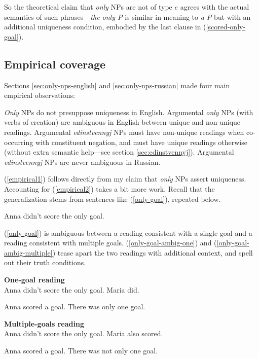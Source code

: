 So the theoretical claim that \textit{only} NPs are not of type $e$ agrees with the actual semantics of such phrases---\textit{the only P} is similar in meaning to \textit{a P} but with an additional uniqueness condition, embodied by the last clause in (\ref{scored-only-goal}).

\subsection{Empirical coverage}
Sections \ref{sec:only-nps-english} and \ref{sec:only-nps-russian} made four main empirical observations:

\begin{exe}
	\ex \label{empirical1} \textit{Only} NPs do not presuppose uniqueness in English.
	\ex \label{empirical2} Argumental \textit{only} NPs (with verbs of creation) are ambiguous in English between unique and non-unique readings.
	\ex \label{empirical3} Argumental \textit{edinstvennyj} NPs must have non-unique readings when co-occurring with constituent negation, and must have unique readings otherwise (without extra semantic help---see section \ref{sec:edinstvennyj}).
	\ex \label{empirical4} Argumental \textit{edinstvennyj} NPs are never ambiguous in Russian.
\end{exe}

(\ref{empirical1}) follows directly from my claim that \textit{only} NPs assert uniqueness. Accounting for (\ref{empirical2}) takes a bit more work. Recall that the generalization stems from sentences like (\ref{only-goal}), repeated below.

\begin{exe}
	 Anna didn't score the only goal.
\end{exe}

(\ref{only-goal}) is ambiguous between a reading consistent with a single goal and a reading consistent with multiple goals. (\ref{only-goal-ambig-one}) and (\ref{only-goal-ambig-multiple}) tease apart the two readings with additional context, and spell out their truth conditions.

\begin{exe}
	\ex \label{only-goal-ambig-one} \textbf{One-goal reading} \\ Anna didn't score the only goal. Maria did.
	\begin{xlist}
		\ex Anna scored a goal.
		\ex There was only one goal.
	\end{xlist}

	\ex \label{only-goal-ambig-multiple} \textbf{Multiple-goals reading} \\ Anna didn't score the only goal. Maria also scored.
	\begin{xlist}
		\ex Anna scored a goal.
		\ex There was not only one goal.
	\end{xlist}
\end{exe}

